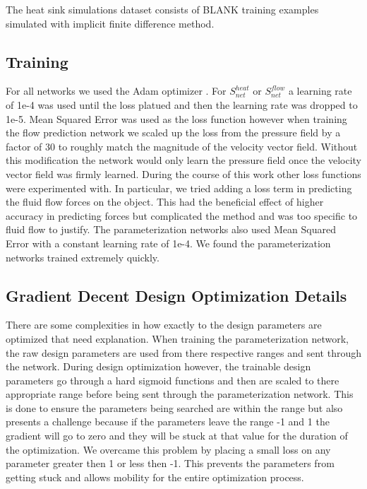 \documentclass{article} %
\begin{document}
The heat sink simulations dataset consists of BLANK training examples simulated with implicit finite difference method.

\subsection{Training}

For all networks we used the Adam optimizer \cite{kingma2014adam}. For $S^{heat}_{net}$ or $S^{flow}_{net}$ a learning rate of 1e-4 was used until the loss platued and then the learning rate was dropped to 1e-5. Mean Squared Error was used as the loss function however when training the flow prediction network we scaled up the loss from the pressure field by a factor of 30 to roughly match the magnitude of the velocity vector field. Without this modification the network would only learn the pressure field once the velocity vector field was firmly learned. During the course of this work other loss functions were experimented with. In particular, we tried adding a loss term in predicting the fluid flow forces on the object. This had the beneficial effect of higher accuracy in predicting forces but complicated the method and was too specific to fluid flow to justify. The parameterization networks also used Mean Squared Error with a constant learning rate of 1e-4. We found the parameterization networks trained extremely quickly.

\subsection{Gradient Decent Design Optimization Details}

There are some complexities in how exactly to the design parameters are optimized that need explanation. When training the parameterization network, the raw design parameters are used from there respective ranges and sent through the network. During design optimization however, the trainable design parameters go through a hard sigmoid functions and then are scaled to there appropriate range before being sent through the parameterization network. This is done to ensure the parameters being searched are within the range but also presents a challenge because if the parameters leave the range -1 and 1 the gradient will go to zero and they will be stuck at that value for the duration of the optimization. We overcame this problem by placing a small loss on any parameter greater then 1 or less then -1. This prevents the parameters from getting stuck and allows mobility for the entire optimization process.
\end{document}
